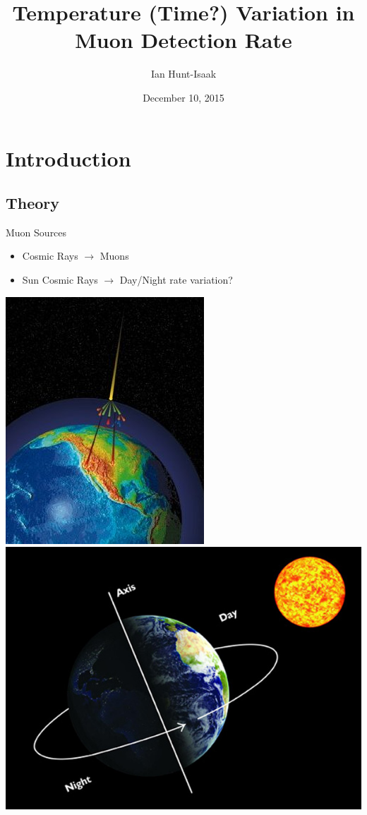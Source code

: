 \documentclass{beamer}
\title[Muon Rate - Phys 314]{Temperature (Time?) Variation in Muon Detection Rate}
\author[Ian Hunt-Isaak]{Ian Hunt-Isaak}
\institute[Oberlin College]{Partner: Corina Miner}
\date{December 10, 2015}
\begin{document}
\begin{frame}
  \titlepage
\end{frame}


\section{Introduction}
\subsection{Theory}
\begin{frame}{Muon Sources}
\begin{itemize}
	\item Cosmic Rays $\to$ Muons
	\item Sun Cosmic Rays $\to$ Day/Night rate variation?
\end{itemize}
\centering
\includegraphics[scale=.4]{../Figures/crhitsearth.jpg}
\hspace{20pt}
\includegraphics[scale=.3]{../Figures/dayNight.jpg}
\end{frame}
\end{document}
